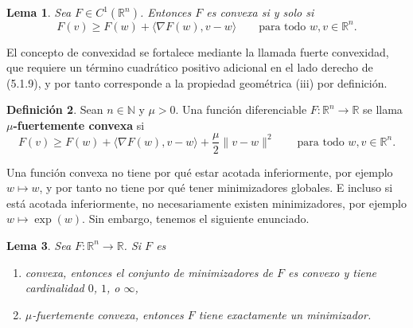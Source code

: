 \documentclass[11pt]{report}
\newenvironment{tcolorbox}[1][]{\par\medskip\noindent\ignorespaces}{\par\medskip}
\theoremstyle{definition}
\newtheorem{definicion}{Definición}[section]
\theoremstyle{plain}
\newtheorem{lema}[definicion]{Lema}
\numberwithin{equation}{section}
\begin{document}
\begin{tcolorbox}[colback=blue!8, colframe=blue!8, boxrule=0pt]
\begin{lema}
Sea \(F\in C^1(\mathbb{R}^n)\). Entonces \(F\) es convexa si y solo si
\begin{equation*}
    F(v)
    \geq
    F(w)+\langle\nabla F(w),v-w\rangle
    \qquad
    \text{para todo } w,v\in\mathbb{R}^n.
    \tag{5.1.9}
\end{equation*}
\end{lema}
\end{tcolorbox}

El concepto de convexidad se fortalece mediante la llamada fuerte convexidad, que requiere un término cuadrático positivo adicional en el lado derecho de (5.1.9), y por tanto corresponde a la propiedad geométrica (iii) por definición.

\begin{tcolorbox}[colback=blue!8, colframe=blue!8, boxrule=0pt]
\begin{definicion}
Sean \(n\in\mathbb{N}\) y \(\mu>0\). Una función diferenciable \(F:\mathbb{R}^n\to\mathbb{R}\) se llama \textbf{\(\mu\)-fuertemente convexa} si
\begin{equation*}
    F(v)
    \geq
    F(w)+\langle\nabla F(w),v-w\rangle
    +
    \frac{\mu}{2}\|v-w\|^2
    \qquad
    \text{para todo } w,v\in\mathbb{R}^n.
    \tag{5.1.10}
\end{equation*}
\end{definicion}
\end{tcolorbox}

Una función convexa no tiene por qué estar acotada inferiormente, por ejemplo \(w\mapsto w\), y por tanto no tiene por qué tener minimizadores globales. E incluso si está acotada inferiormente, no necesariamente existen minimizadores, por ejemplo \(w\mapsto \exp(w)\). Sin embargo, tenemos el siguiente enunciado.

\begin{tcolorbox}[colback=blue!8, colframe=blue!8, boxrule=0pt]
\begin{lema}
Sea \(F:\mathbb{R}^n\to\mathbb{R}\). Si \(F\) es

\begin{enumerate}
    \item[(i)] convexa, entonces el conjunto de minimizadores de \(F\) es convexo y tiene cardinalidad \(0\), \(1\), o \(\infty\),

    \item[(ii)] \(\mu\)-fuertemente convexa, entonces \(F\) tiene exactamente un minimizador.
\end{enumerate}
\end{lema}
\end{tcolorbox}
\end{document}
